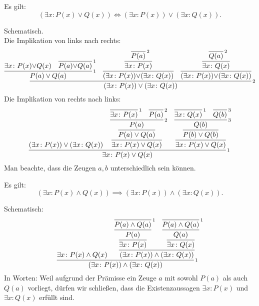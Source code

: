\begin{Satz}\label{exists-dl}
Es gilt:
\[(\exists x\colon P(x)\lor Q(x)) \iff
(\exists x\colon P(x))\lor(\exists x\colon Q(x)).\]
\end{Satz}
\begin{Beweis} Schematisch.\\
Die Implikation von links nach rechts:
\[\infer[\infernote{2}]{(\exists x\colon P(x))\lor (\exists x\colon Q(x))}{
  \infer[\infernote{1}]{P(a)\lor Q(a)}{
    \exists x\colon P(x){\lor}Q(x)
    & \infer[\infernote{1}]{P(a){\lor}Q(a)}{}
  }
  & \infer{(\exists x\colon P(x)){\lor}(\exists x\colon Q(x))}{\infer{
      \exists x\colon P(x)}{\infer[\infernote{2}]{P(a)}{}}}
  & \infer{(\exists x\colon P(x)){\lor}(\exists x\colon Q(x))}{\infer{
      \exists x\colon Q(x)}{\infer[\infernote{2}]{Q(a)}{}}}
}\]
Die Implikation von rechts nach links:
\[\infer[\infernote{1}]{\exists x\colon P(x)\lor Q(x)}{
  (\exists x\colon P(x))\lor(\exists x\colon Q(x))
  & \infer{\exists x\colon P(x)\lor Q(x)}{
      \infer{P(a)\lor Q(a)}{
        \infer[\infernote{2}]{P(a)}{
          \infer[\infernote{1}]{\exists x\colon P(x)}{}
          & \infer[\infernote{2}]{P(a)}{}}}}
  & \infer{\exists x\colon P(x)\lor Q(x)}{
      \infer{P(b)\lor Q(b)}{
        \infer[\infernote{3}]{Q(b)}{
          \infer[\infernote{1}]{\exists x\colon Q(x)}{}
          & \infer[\infernote{3}]{Q(b)}{}}}}
}\]
Man beachte, dass die Zeugen $a,b$ unterschiedlich sein können.\,\qedsymbol
\end{Beweis}

\begin{Satz}\label{exists-asym-dl}
Es gilt:
\[(\exists x\colon P(x)\land Q(x)) \implies (\exists x\colon P(x))\land (\exists x\colon Q(x)).\]
\end{Satz}
\begin{Beweis} Schematisch:
\[\infer[\infernote{1}]{(\exists x\colon P(x))\land (\exists x\colon Q(x))}{
\exists x\colon P(x)\land Q(x)
& \infer{(\exists x\colon P(x))\land (\exists x\colon Q(x))}{
  \infer{\exists x\colon P(x)}{
       \infer{P(a)}{\infer[\infernote{1}]{P(a)\land Q(a)}{}}}
  & \infer{\exists x\colon Q(x)}{
       \infer{Q(a)}{\infer[\infernote{1}]{P(a)\land Q(a)}{}}}}
}\]
In Worten: Weil aufgrund der Prämisse ein Zeuge $a$ mit sowohl $P(a)$
als auch $Q(a)$ vorliegt, dürfen wir schließen, dass die
Existenzaussagen $\exists x\colon P(x)$ und $\exists x\colon Q(x)$
erfüllt sind.\,\qedsymbol
\end{Beweis}

